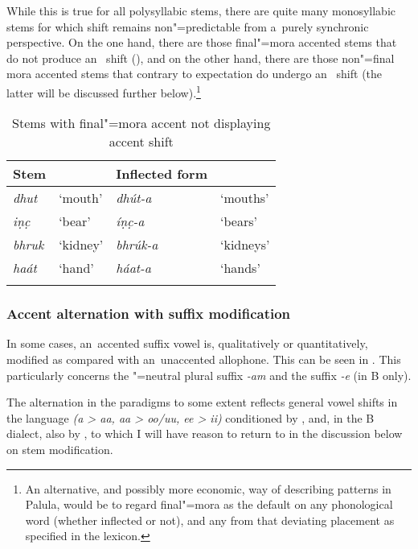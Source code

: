 While this is true for all polysyllabic stems, there are quite many monosyllabic stems for which  shift remains non"=predictable from a~purely synchronic perspective. On the one hand, there are those final"=mora accented stems that do not produce an~ shift (), and on the other hand, there are those non"=final mora accented stems that contrary to expectation do undergo an~ shift (the latter will be discussed further below).\footnote{An alternative, and possibly more economic, way of describing  patterns in Palula, would be to regard final"=mora  as the default  on any phonological word (whether inflected or not), and any from that deviating placement as specified in the lexicon.}



\begin{table}[p]
\caption{ Stems with final"=mora {accent} not displaying {accent} shift}
\begin{tabularx}{\textwidth}{XXXX}
\lsptoprule
Stem &
&
Inflected form &
\\\midrule
\textit{dhut} &
`mouth' &
\textit{dhút-a} &
`mouths'\\
\textit{iṇc̣} &
`bear' &
\textit{íṇc̣-a} &
`bears'\\
\textit{bhruk} &
`kidney' &
\textit{bhrúk-a} &
`kidneys'\\
\textit{haát} &
`hand' &
\textit{háat-a} &
`hands'\\\lspbottomrule
\end{tabularx}
\label{tab:3-10}
\end{table}

\subsubsection*{Accent alternation with suffix modification}

In some cases, an~accented suffix vowel is, qualitatively or quantitatively, modified as compared with an~unaccented allophone. This can be seen in . This particularly concerns the
"=neutral plural  suffix \textit{-am} and the  suffix \textit{-e} (in B only).

The alternation in the paradigms to some extent reflects general vowel shifts in the language
\textit{(a {\textgreater} aa, aa {\textgreater} oo/uu, ee {\textgreater} ii)} conditioned by ,
and, in the B dialect, also by , to which I will have reason to return to in the
discussion below on stem modification.

